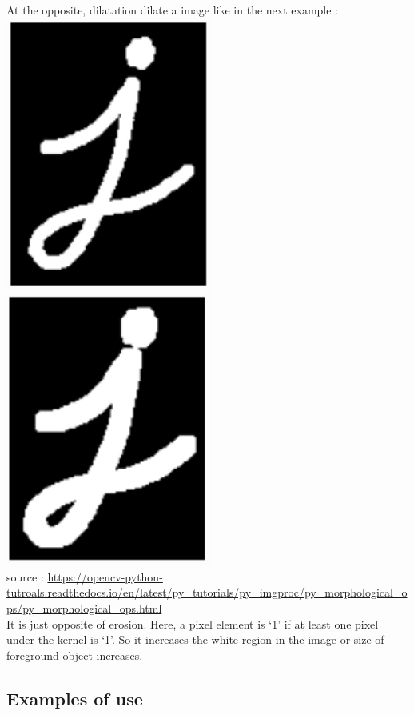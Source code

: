 \documentclass{article}
\begin{document}
At the opposite, dilatation dilate a image like in the next example :\\

\includegraphics[width=6.8cm]{images/img12.png} 
\includegraphics[width=6.8cm]{images/img14.png}\\ 
source : \url{https://opencv-python-tutroals.readthedocs.io/en/latest/py_tutorials/py_imgproc/py_morphological_ops/py_morphological_ops.html}\\

It is just opposite of erosion. Here, a pixel element is ‘1’ if at least one pixel under the kernel is ‘1’. So it increases the white region in the image or size of foreground object increases.

\subsection{Examples of use}
\end{document}
